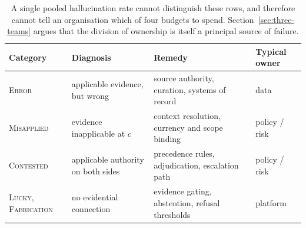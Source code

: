 \begin{table}[ht]
  \centering
  \begin{tabular}{@{}>{\raggedright\arraybackslash}p{2.6cm}>{\raggedright\arraybackslash}p{4.0cm}>{\raggedright\arraybackslash}p{4.4cm}>{\raggedright\arraybackslash}p{2.3cm}@{}}
    \toprule
    Category & Diagnosis & Remedy & Typical owner \\
    \midrule
    \textsc{Error}
      & applicable evidence, but wrong
      & source authority, curation, systems of record
      & data \\
    \addlinespace
    \textsc{Misapplied}
      & evidence inapplicable at $c$
      & context resolution, currency and scope binding
      & policy / risk \\
    \addlinespace
    \textsc{Contested}
      & applicable authority on both sides
      & precedence rules, adjudication, escalation path
      & policy / risk \\
    \addlinespace
    \textsc{Lucky}, \textsc{Fabrication}
      & no evidential connection
      & evidence gating, abstention, refusal thresholds
      & platform \\
    \bottomrule
  \end{tabular}
  \caption{A single pooled hallucination rate cannot distinguish these rows, and
    therefore cannot tell an organisation which of four budgets to spend.
    Section~\ref{sec:three-teams} argues that the division of ownership is itself
    a principal source of failure.}
  \label{tab:remedies}
\end{table}
